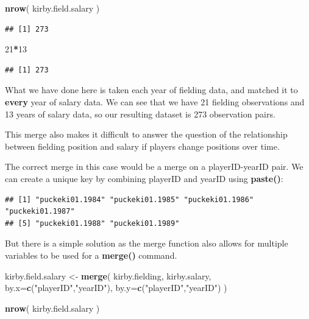 \documentclass[]{book}
\newenvironment{Shaded}{\begin{snugshade}}{\end{snugshade}}
\newcommand{\DataTypeTok}[1]{\textcolor[rgb]{0.13,0.29,0.53}{#1}}
\newcommand{\DecValTok}[1]{\textcolor[rgb]{0.00,0.00,0.81}{#1}}
\newcommand{\KeywordTok}[1]{\textcolor[rgb]{0.13,0.29,0.53}{\textbf{#1}}}
\newcommand{\NormalTok}[1]{#1}
\newcommand{\OperatorTok}[1]{\textcolor[rgb]{0.81,0.36,0.00}{\textbf{#1}}}
\newcommand{\StringTok}[1]{\textcolor[rgb]{0.31,0.60,0.02}{#1}}
\theoremstyle{definition}
\theoremstyle{definition}
\theoremstyle{definition}
\theoremstyle{remark}
\begin{document}
\begin{Shaded}
\begin{Highlighting}[]
\KeywordTok{nrow}\NormalTok{( kirby.field.salary )}
\end{Highlighting}
\end{Shaded}

\begin{verbatim}
## [1] 273
\end{verbatim}

\begin{Shaded}
\begin{Highlighting}[]
\DecValTok{21}\OperatorTok{*}\DecValTok{13}
\end{Highlighting}
\end{Shaded}

\begin{verbatim}
## [1] 273
\end{verbatim}

What we have done here is taken each year of fielding data, and matched
it to \textbf{every} year of salary data. We can see that we have 21
fielding observations and 13 years of salary data, so our resulting
dataset is 273 observation pairs.

This merge also makes it difficult to answer the question of the
relationship between fielding position and salary if players change
positions over time.

The correct merge in this case would be a merge on a playerID-yearID
pair. We can create a unique key by combining playerID and yearID using
\textbf{paste()}:

\begin{Shaded}
\end{Shaded}

\begin{verbatim}
## [1] "puckeki01.1984" "puckeki01.1985" "puckeki01.1986" "puckeki01.1987"
## [5] "puckeki01.1988" "puckeki01.1989"
\end{verbatim}

But there is a simple solution as the merge function also allows for
multiple variables to be used for a \textbf{merge()} command.

\begin{Shaded}
\begin{Highlighting}[]
\NormalTok{kirby.field.salary <-}\StringTok{ }\KeywordTok{merge}\NormalTok{( kirby.fielding, kirby.salary, }
                            \DataTypeTok{by.x=}\KeywordTok{c}\NormalTok{(}\StringTok{"playerID"}\NormalTok{,}\StringTok{"yearID"}\NormalTok{), }
                            \DataTypeTok{by.y=}\KeywordTok{c}\NormalTok{(}\StringTok{"playerID"}\NormalTok{,}\StringTok{"yearID"}\NormalTok{)   )}

\KeywordTok{nrow}\NormalTok{( kirby.field.salary )}
\end{Highlighting}
\end{Shaded}
\end{document}
